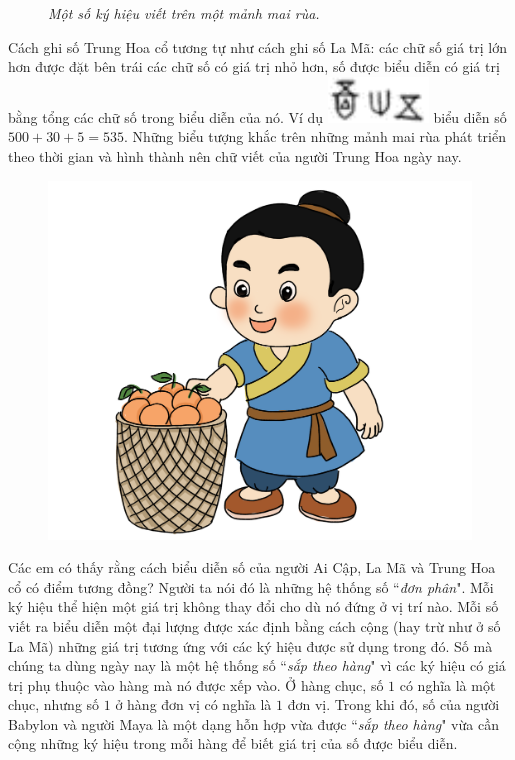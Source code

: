\begin{multicols}{2}
\begin{figure}[H]
		\caption{\textit{\color{toancuabi}Một số ký hiệu viết trên một mảnh mai rùa.}}
		\vspace*{-10pt}
	\end{figure}
	Cách ghi số Trung Hoa cổ tương tự như cách ghi số La Mã: các chữ số giá trị lớn hơn được đặt bên trái các chữ số có  giá trị nhỏ hơn, số được biểu diễn có giá trị bằng tổng các chữ số trong biểu diễn của nó. Ví dụ \includegraphics[scale=0.25]{china5} biểu diễn số $500 + 30 + 5 = 535$. Những biểu tượng khắc trên những mảnh mai rùa phát triển theo thời gian và hình thành nên chữ viết của người Trung Hoa ngày nay. 
	\begin{figure}[H]
		\centering
		\vspace*{-5pt}
		\captionsetup{labelformat= empty, justification=centering}
		\includegraphics[width=0.9\linewidth]{20.12-pi.3}
		\vspace*{-10pt}
	\end{figure}
	Các em có thấy rằng cách biểu diễn số của người Ai Cập, La Mã và Trung Hoa cổ có điểm tương đồng? Người ta nói đó là những hệ thống số ``\textit{đơn phân}". Mỗi ký hiệu thể hiện một giá trị không thay đổi cho dù nó đứng ở vị trí nào. Mỗi số viết ra biểu diễn một đại lượng được xác định bằng cách  cộng (hay trừ như ở số La Mã) những giá trị tương ứng với các ký hiệu được sử dụng trong đó. Số mà chúng ta dùng ngày nay là một hệ thống số ``\textit{sắp theo hàng}" vì các ký hiệu có giá trị phụ thuộc vào hàng mà nó được xếp vào. Ở hàng chục, số $1$ có nghĩa là một chục, nhưng số $1$ ở hàng đơn vị có nghĩa là $1$ đơn vị. Trong khi đó, số của người Babylon và người Maya là một dạng hỗn hợp vừa được ``\textit{sắp theo hàng}" vừa cần cộng những ký hiệu trong mỗi hàng để biết giá trị của số được biểu diễn.

\end{multicols}
